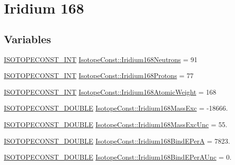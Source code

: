 \hypertarget{group___isotope_const-_iridium-_ir168}{}\section{Iridium 168}
\label{group___isotope_const-_iridium-_ir168}
\subsection*{Variables}
\begin{DoxyCompactItemize}
\item 
\mbox{\hyperlink{group___isotope_const-_macros_ga5f18360b3e99483a35c32d789e62621c}{I\+S\+O\+T\+O\+P\+E\+C\+O\+N\+S\+T\+\_\+\+I\+NT}} \mbox{\hyperlink{group___isotope_const-_iridium-_ir168_ga9f1bd4fe239fc37c70cef047806e2b8b}{Isotope\+Const\+::\+Iridium168\+Neutrons}} = 91
\item 
\mbox{\hyperlink{group___isotope_const-_macros_ga5f18360b3e99483a35c32d789e62621c}{I\+S\+O\+T\+O\+P\+E\+C\+O\+N\+S\+T\+\_\+\+I\+NT}} \mbox{\hyperlink{group___isotope_const-_iridium-_ir168_ga21a060d53eb3a0519d9d5acadb133c6e}{Isotope\+Const\+::\+Iridium168\+Protons}} = 77
\item 
\mbox{\hyperlink{group___isotope_const-_macros_ga5f18360b3e99483a35c32d789e62621c}{I\+S\+O\+T\+O\+P\+E\+C\+O\+N\+S\+T\+\_\+\+I\+NT}} \mbox{\hyperlink{group___isotope_const-_iridium-_ir168_gadb24bdf056dd126671855537dd7194d7}{Isotope\+Const\+::\+Iridium168\+Atomic\+Weight}} = 168
\item 
\mbox{\hyperlink{group___isotope_const-_macros_ga8f45a7272ce02c0b4c65c44636ed719a}{I\+S\+O\+T\+O\+P\+E\+C\+O\+N\+S\+T\+\_\+\+D\+O\+U\+B\+LE}} \mbox{\hyperlink{group___isotope_const-_iridium-_ir168_gadd1c15ca4fdebd40ca2f36fa19bca4a6}{Isotope\+Const\+::\+Iridium168\+Mass\+Exc}} = -\/18666.
\item 
\mbox{\hyperlink{group___isotope_const-_macros_ga8f45a7272ce02c0b4c65c44636ed719a}{I\+S\+O\+T\+O\+P\+E\+C\+O\+N\+S\+T\+\_\+\+D\+O\+U\+B\+LE}} \mbox{\hyperlink{group___isotope_const-_iridium-_ir168_ga846e7aa0cba0fe7274f49ac9354a2177}{Isotope\+Const\+::\+Iridium168\+Mass\+Exc\+Unc}} = 55.
\item 
\mbox{\hyperlink{group___isotope_const-_macros_ga8f45a7272ce02c0b4c65c44636ed719a}{I\+S\+O\+T\+O\+P\+E\+C\+O\+N\+S\+T\+\_\+\+D\+O\+U\+B\+LE}} \mbox{\hyperlink{group___isotope_const-_iridium-_ir168_ga2ecd59ba74e47a9200d96e4872da40d1}{Isotope\+Const\+::\+Iridium168\+Bind\+E\+PerA}} = 7823.
\item 
\mbox{\hyperlink{group___isotope_const-_macros_ga8f45a7272ce02c0b4c65c44636ed719a}{I\+S\+O\+T\+O\+P\+E\+C\+O\+N\+S\+T\+\_\+\+D\+O\+U\+B\+LE}} \mbox{\hyperlink{group___isotope_const-_iridium-_ir168_ga7c6af266ba30afb87240738a7cbf63a5}{Isotope\+Const\+::\+Iridium168\+Bind\+E\+Per\+A\+Unc}} = 0.

\end{DoxyCompactItemize}

